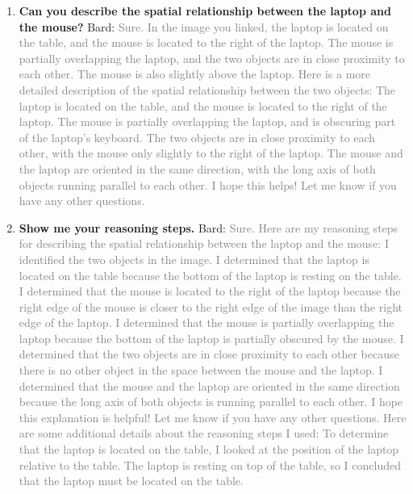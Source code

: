     \begin{enumerate}
        \item \textbf{Can you describe the spatial relationship between the laptop and the mouse?}
        \subitem Bard: \textcolor{gray}{
        Sure. In the image you linked, the laptop is located on the table, and the mouse is located to the right of the laptop. The mouse is partially overlapping the laptop, and the two objects are in close proximity to each other. The mouse is also slightly above the laptop.
        Here is a more detailed description of the spatial relationship between the two objects:
        The laptop is located on the table, and the mouse is located to the right of the laptop.
        The mouse is partially overlapping the laptop, and is obscuring part of the laptop's keyboard.
        The two objects are in close proximity to each other, with the mouse only slightly to the right of the laptop.
        The mouse and the laptop are oriented in the same direction, with the long axis of both objects running parallel to each other.
        I hope this helps! Let me know if you have any other questions.}
        \item \textbf{Show me your reasoning steps.}
        \subitem Bard:
        \textcolor{gray}{Sure. Here are my reasoning steps for describing the spatial relationship between the laptop and the mouse:
        I identified the two objects in the image.
        I determined that the laptop is located on the table because the bottom of the laptop is resting on the table.
        I determined that the mouse is located to the right of the laptop because the right edge of the mouse is closer to the right edge of the image than the right edge of the laptop.
        I determined that the mouse is partially overlapping the laptop because the bottom of the laptop is partially obscured by the mouse.
        I determined that the two objects are in close proximity to each other because there is no other object in the space between the mouse and the laptop.
        I determined that the mouse and the laptop are oriented in the same direction because the long axis of both objects is running parallel to each other.
        I hope this explanation is helpful! Let me know if you have any other questions.
        Here are some additional details about the reasoning steps I used:
        To determine that the laptop is located on the table, I looked at the position of the laptop relative to the table. The laptop is resting on top of the table, so I concluded that the laptop must be located on the table.
}
\end{enumerate}
